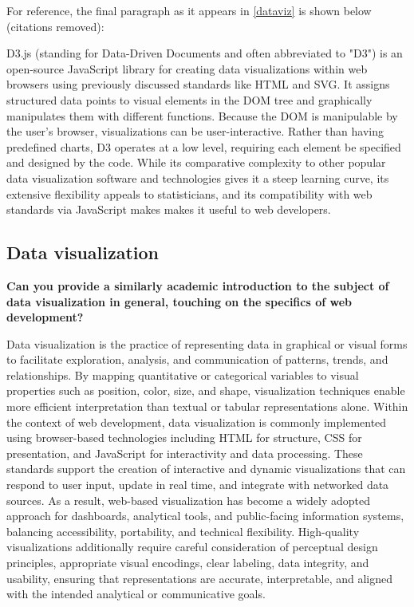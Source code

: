 For reference, the final paragraph as it appears in \autoref{dataviz} is shown below (citations removed):

\begin{singlespace}\small
	D3.js (standing for Data-Driven Documents and often abbreviated to "D3") is an open-source JavaScript library for creating data visualizations within web browsers using previously discussed standards like HTML and SVG. It assigns structured data points to visual elements in the DOM tree and graphically manipulates them with different functions. Because the DOM is manipulable by the user's browser, visualizations can be user-interactive. Rather than having predefined charts, D3 operates at a low level, requiring each element be specified and designed by the code. While its comparative complexity to other popular data visualization software and technologies gives it a steep learning curve, its extensive flexibility appeals to statisticians, and its compatibility with web standards via JavaScript makes makes it useful to web developers.
\end{singlespace}

\subsection{Data visualization}

\begin{singlespace}\small
\textbf{\textsf{Can you provide a similarly academic introduction to the subject of data visualization in general, touching on the specifics of web development?}}
\end{singlespace}

\begin{singlespace}\small
\textsf{Data visualization is the practice of representing data in graphical or visual forms to facilitate exploration, analysis, and communication of patterns, trends, and relationships. By mapping quantitative or categorical variables to visual properties such as position, color, size, and shape, visualization techniques enable more efficient interpretation than textual or tabular representations alone. Within the context of web development, data visualization is commonly implemented using browser-based technologies including HTML for structure, CSS for presentation, and JavaScript for interactivity and data processing. These standards support the creation of interactive and dynamic visualizations that can respond to user input, update in real time, and integrate with networked data sources. As a result, web-based visualization has become a widely adopted approach for dashboards, analytical tools, and public-facing information systems, balancing accessibility, portability, and technical flexibility. High-quality visualizations additionally require careful consideration of perceptual design principles, appropriate visual encodings, clear labeling, data integrity, and usability, ensuring that representations are accurate, interpretable, and aligned with the intended analytical or communicative goals.}
\end{singlespace}

